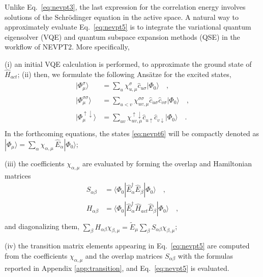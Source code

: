 \documentclass[aps,pra,twocolumn]{revtex4-2}
\newcommand{\dst}[1]{\hat{c}_{#1}^{\phantom{\dagger}}}
\begin{document}
Unlike Eq.~\eqref{eq:nevpt3}, the last expression for the correlation energy involves solutions of the Schr\"{o}dinger equation in the active space.
A natural way to approximately evaluate Eq.~\eqref{eq:nevpt5} is to integrate the variational quantum eigensolver (VQE) 
and quantum subspace expansion methods (QSE) in the workflow of NEVPT2. More specifically, 

(i) an initial VQE calculation is performed, to approximate the ground state of $\hat{H}_{act}$; (ii) then, we formulate the following Ans\"{a}tze for the excited states,
\begin{equation}
\label{eq:nevpt6}
\begin{split}
| \Phi^\sigma_{\mu} \rangle &= \sum_u \chi^\sigma_{u,\mu} \dst{u\sigma} | \Phi_0 \rangle \quad, \\
| \Phi^{\sigma\sigma}_{\mu} \rangle &= \sum_{u<v} \chi^{\sigma\sigma}_{uv,\mu} \dst{u\sigma} \dst{v\sigma} | \Phi_0 \rangle \quad, \\
| \Phi^{\uparrow\downarrow}_{\mu} \rangle &= \sum_{uv} \chi^{\uparrow\downarrow}_{uv,\mu} \dst{u\uparrow} \dst{v\downarrow} | \Phi_0 \rangle \quad. \\
\end{split}
\end{equation}
In the forthcoming equations, the states \eqref{eq:nevpt6} will be compactly denoted as $| \Phi_\mu \rangle = \sum_\alpha \chi_{\alpha,\mu} \, \hat{E}_\alpha | \Phi_0 \rangle$;

(iii) the coefficients $\chi_{\alpha,\mu}$ are evaluated by forming the overlap and Hamiltonian matrices
\begin{equation}
\label{eq:nevpt7}
\begin{split}
S_{\alpha\beta} &= \langle \Phi_0 | \hat{E}_\alpha^\dagger \hat{E}_\beta | \Phi_0 \rangle \quad, \\
H_{\alpha\beta} &= \langle \Phi_0 | \hat{E}_\alpha^\dagger \hat{H}_{act} \hat{E}_\beta | \Phi_0 \rangle \quad, \\
\end{split}
\end{equation}
and diagonalizing them, $\sum_\beta H_{\alpha\beta} \chi_{\beta,\mu} = \tilde{E}_\mu \sum_\beta S_{\alpha\beta} \chi_{\beta,\mu}$;

(iv) the transition matrix elements appearing in Eq.~\eqref{eq:nevpt5} are computed from the coefficients $\chi_{\alpha,\mu}$ and the overlap matrices $S_{\alpha\beta}$
with the formulas reported in Appendix \ref{app:transition}, and Eq.~\eqref{eq:nevpt5} is evaluated.
\end{document}
